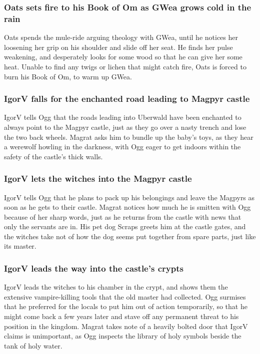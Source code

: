 \subsubsection{\Gls{Oats} sets fire to his Book of Om as \Gls{GWea} grows cold in the rain}
\Gls{Oats} spends the mule-ride arguing theology with \Gls{GWea}, until he notices her loosening
her grip on his shoulder and slide off her seat. He finds her pulse weakening, and desperately looks
for some wood so that he can give her some heat. Unable to find any twigs or lichen that might
catch fire, \Gls{Oats} is forced to burn his Book of Om, to warm up \Gls{GWea}.

\subsubsection{\Gls{IgorV} falls for the enchanted road leading to Magpyr castle}
\Gls{IgorV} tells \Gls{Ogg} that the roads leading into Uberwald have been enchanted to always
point to the Magpyr castle, just as they go over a nasty trench and lose the two back wheels.
\Gls{Magrat} asks him to bundle up the baby's toys, as they hear a werewolf howling in the darkness,
with \Gls{Ogg} eager to get indoors within the safety of the castle's thick walls.

\subsubsection{\Gls{IgorV} lets the witches into the Magpyr castle}
\Gls{IgorV} tells \Gls{Ogg} that he plans to pack up his belongings and leave the Magpyrs as soon
as he gets to their castle. \Gls{Magrat} notices how much he is smitten with \Gls{Ogg} because of
her sharp words, just as he returns from the castle with news that only the servants are in. His
pet dog \Gls{Scraps} greets him at the castle gates, and the witches take not of how the dog seems
put together from spare parts, just like its master.

\subsubsection{\Gls{IgorV} leads the way into the castle's crypts}
\Gls{IgorV} leads the witches to his chamber in the crypt, and shows them the extensive
vampire-killing tools that the old master had collected. \Gls{Ogg} surmises that he preferred for
the locals to put him out of action temporarily, so that he might come back a few years later and
stave off any permanent threat to his position in the kingdom. \Gls{Magrat} takes note of a heavily
bolted door that \Gls{IgorV} claims is unimportant, as \Gls{Ogg} inspects the library of holy
symbols beside the tank of holy water.

